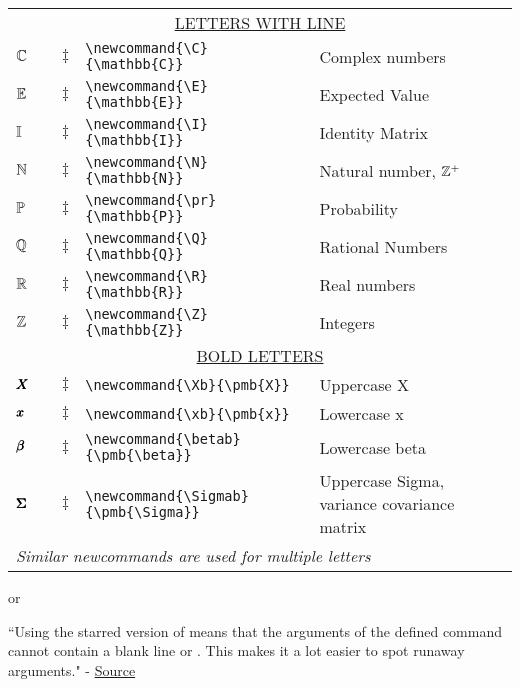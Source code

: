 \documentclass[11pt, letterpaper]{article}
\begin{document}
\begin{longtable}{p{.75in} p{.9in} p{.01in} p{3.55in}  p{1.45in} }
\multicolumn{5}{c}{\underline{LETTERS WITH LINE}}
\\* 
$\C$	&\code{\textbackslash C}	&$\ddagger$	&\lstinline|\newcommand{\C}{\mathbb{C}}|	&Complex numbers 
\\* 
$\E$	&\code{\textbackslash E}	&$\ddagger$	&\lstinline|\newcommand{\E}{\mathbb{E}}|	&Expected Value 
\\*
$\I$	&\code{\textbackslash I}	&$\ddagger$	&\lstinline|\newcommand{\I}{\mathbb{I}}|	&Identity Matrix 
\\*
$\N$	&\code{\textbackslash N}	&$\ddagger$	&\lstinline|\newcommand{\N}{\mathbb{N}}|	&Natural number, $\Z^+$ 
\\*  
$\pr$	&\code{\textbackslash pr}	&$\ddagger$	&\lstinline|\newcommand{\pr}{\mathbb{P}}|	&Probability 
\\* 
$\Q$	&\code{\textbackslash Q}	&$\ddagger$	&\lstinline|\newcommand{\Q}{\mathbb{Q}}|	&Rational Numbers 
\\* 
$\R$	&\code{\textbackslash R}	&$\ddagger$	&\lstinline|\newcommand{\R}{\mathbb{R}}|	&Real numbers 
\\* 
$\Z$	&\code{\textbackslash Z}	&$\ddagger$	&\lstinline|\newcommand{\Z}{\mathbb{Z}}|	&Integers 
\\  \hline

\multicolumn{5}{c}{\underline{BOLD LETTERS}}
\\* 
$\Xb$	&\code{\textbackslash Xb}	&$\ddagger$	&\lstinline|\newcommand{\Xb}{\pmb{X}}|	&Uppercase X
\\*
$\xb$	&\code{\textbackslash xb}	&$\ddagger$	&\lstinline|\newcommand{\xb}{\pmb{x}}|	&Lowercase x
\\* 
$\betab$	&\code{\textbackslash betab}	&$\ddagger$	&\lstinline|\newcommand{\betab}{\pmb{\beta}}|	&Lowercase beta
\\*
$\Sigmab$	&\code{\textbackslash Sigmab}	&$\ddagger$	&\lstinline|\newcommand{\Sigmab}{\pmb{\Sigma}} |	&Uppercase Sigma, variance covariance matrix
\\*
\multicolumn{5}{l}{\textit{Similar newcommands are used for multiple letters }}
\\ \hline 

\end{longtable}





  or 
 
 ``Using the starred version of  means that the arguments of the defined command cannot contain a blank line or . This makes it a lot easier to spot runaway arguments." - \href{https://tug.org/mail-archives/texhax/2005-March/003732.html}{Source}



 
\end{document}
